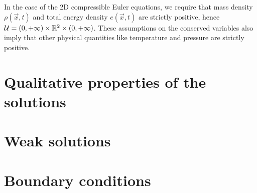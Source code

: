 In the case of the 2D compressible Euler equations, we require that
mass density $\rho(\vec{x},t)$ and total energy density $e(\vec{x},t)$
are strictly positive, hence
$\mathcal{U} = (0,+\infty) \times \mathbb{R}^2 \times (0,+\infty)$.
These assumptions on the conserved variables also imply that
other physical quantities like temperature and pressure are strictly
positive.

\section{Qualitative properties of the solutions}

\section{Weak solutions}

\section{Boundary conditions}











